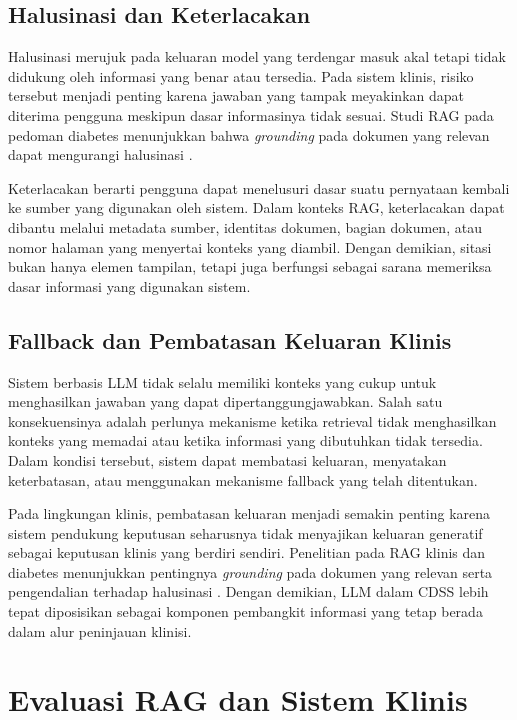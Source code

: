 \subsection{Halusinasi dan Keterlacakan}
\label{subsec:bab2-hallucination-traceability}

Halusinasi merujuk pada keluaran model yang terdengar masuk akal tetapi tidak didukung oleh informasi yang benar atau tersedia. Pada sistem klinis, risiko tersebut menjadi
penting karena jawaban yang tampak meyakinkan dapat diterima pengguna meskipun dasar informasinya tidak sesuai. Studi RAG pada pedoman diabetes menunjukkan bahwa \textit{grounding}
pada dokumen yang relevan dapat mengurangi halusinasi \parencite{lee2024}.

Keterlacakan berarti pengguna dapat menelusuri dasar suatu pernyataan kembali ke sumber yang digunakan oleh sistem. Dalam konteks RAG, keterlacakan dapat dibantu melalui
metadata sumber, identitas dokumen, bagian dokumen, atau nomor halaman yang menyertai konteks yang diambil. Dengan demikian, sitasi bukan hanya elemen tampilan, tetapi
juga berfungsi sebagai sarana memeriksa dasar informasi yang digunakan sistem.

\subsection{Fallback dan Pembatasan Keluaran Klinis}
\label{subsec:bab2-fallback-clinical-output}

Sistem berbasis LLM tidak selalu memiliki konteks yang cukup untuk menghasilkan jawaban yang dapat dipertanggungjawabkan. Salah satu konsekuensinya adalah perlunya mekanisme
ketika retrieval tidak menghasilkan konteks yang memadai atau ketika informasi yang dibutuhkan tidak tersedia. Dalam kondisi tersebut, sistem dapat membatasi keluaran,
menyatakan keterbatasan, atau menggunakan mekanisme fallback yang telah ditentukan.

Pada lingkungan klinis, pembatasan keluaran menjadi semakin penting karena sistem pendukung keputusan seharusnya tidak menyajikan keluaran generatif sebagai keputusan klinis
yang berdiri sendiri. Penelitian pada RAG klinis dan diabetes menunjukkan pentingnya \textit{grounding} pada dokumen yang relevan serta pengendalian terhadap halusinasi
\parencite{kresevic2024,lee2024,wang2024}. Dengan demikian, LLM dalam CDSS lebih tepat diposisikan sebagai komponen pembangkit informasi yang tetap berada dalam alur
peninjauan klinisi.

\section{Evaluasi RAG dan Sistem Klinis}
\label{sec:bab2-evaluasi-rag-sistem-klinis}

